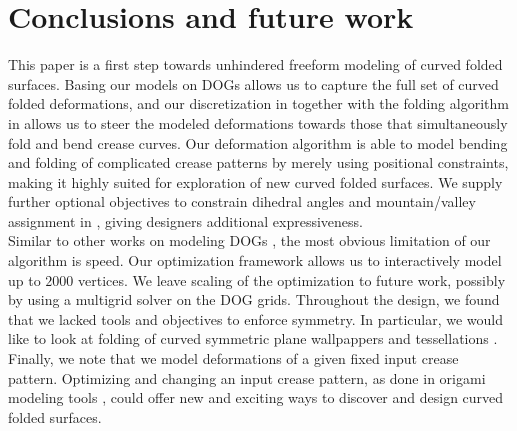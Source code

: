 \section{Conclusions and future work}
This paper is a first step towards unhindered freeform modeling of curved folded surfaces. Basing our models on DOGs  allows us to capture the full set of curved folded deformations, and our discretization in  together with the folding algorithm in  allows us to steer the modeled deformations towards those that simultaneously fold and bend crease curves. Our deformation algorithm is able to model bending and folding of complicated crease patterns by merely using positional constraints, making it highly suited for exploration of new curved folded surfaces. We supply further optional objectives to constrain dihedral angles and mountain/valley assignment in , giving designers additional expressiveness. \\
Similar to other works on modeling DOGs , the most obvious limitation of our algorithm is speed. Our optimization framework allows us to interactively model up to $2000$ vertices. We leave scaling of the optimization to future work, possibly by using a multigrid solver on the DOG grids. Throughout the design, we found that we lacked tools and objectives to enforce symmetry. In particular, we would like to look at folding of curved symmetric plane wallpappers and tessellations \cite{demaine_lens,mundilova2019mathematical}. Finally, we note that we model deformations of a given fixed input crease pattern. Optimizing and changing an input crease pattern, as done in origami modeling tools \cite{tachi2010freeform}, could offer new and exciting ways to discover and design curved folded surfaces. 